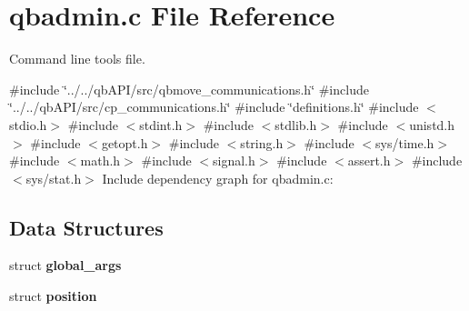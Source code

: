 \section{qbadmin.\+c File Reference}
\label{qbadmin_8c}


Command line tools file.  


{\ttfamily \#include \char`\"{}../../qb\+A\+P\+I/src/qbmove\+\_\+communications.\+h\char`\"{}}\newline
{\ttfamily \#include \char`\"{}../../qb\+A\+P\+I/src/cp\+\_\+communications.\+h\char`\"{}}\newline
{\ttfamily \#include \char`\"{}definitions.\+h\char`\"{}}\newline
{\ttfamily \#include $<$stdio.\+h$>$}\newline
{\ttfamily \#include $<$stdint.\+h$>$}\newline
{\ttfamily \#include $<$stdlib.\+h$>$}\newline
{\ttfamily \#include $<$unistd.\+h$>$}\newline
{\ttfamily \#include $<$getopt.\+h$>$}\newline
{\ttfamily \#include $<$string.\+h$>$}\newline
{\ttfamily \#include $<$sys/time.\+h$>$}\newline
{\ttfamily \#include $<$math.\+h$>$}\newline
{\ttfamily \#include $<$signal.\+h$>$}\newline
{\ttfamily \#include $<$assert.\+h$>$}\newline
{\ttfamily \#include $<$sys/stat.\+h$>$}\newline
Include dependency graph for qbadmin.\+c\+:
\subsection*{Data Structures}
\begin{DoxyCompactItemize}
\item 
struct \textbf{ global\+\_\+args}
\item 
struct \textbf{ position}
\end{DoxyCompactItemize}
